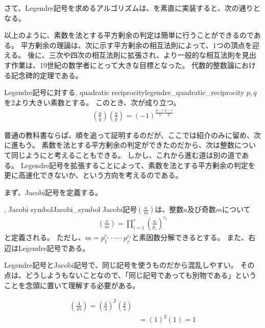さて、Legendre記号を求めるアルゴリズムは、を素直に実装すると、次の通りとなる。


以上のように、素数を法とする平方剰余の判定は簡単に行うことができるのである。
平方剰余の理論は、次に示す平方剰余の相互法則によって、1つの頂点を迎える。
後に、三次や四次の相互法則に拡張され、より一般的な相互法則を見出す作業は、19世紀の数学者にとって大きな目標となった。
代数的整数論における記念碑的定理である。

\begin{Theo}{Legendre記号に対する, quadratic reciprocity}{legendre_quadratic_reciprocity}
$p,q$を2より大きい素数とする。
このとき、次が成り立つ。
\begin{align*}
\left(\frac{p}{q}\right)\left(\frac{q}{p}\right) = (-1)^{\frac{p-1}{2}\frac{q-1}{2}}
\end{align*}
\end{Theo}

普通の教科書ならば、順を追って証明するのだが、ここでは紹介のみに留め、次に進もう。
素数を法とする平方剰余の判定ができたのだから、次は整数について同じようにと考えることもできる。
しかし、これから進む道は別の道である。
Legendre記号を拡張することによって、素数を法とする平方剰余の判定を更に高速化できないか、という方向を考えるのである。

まず、Jacobi記号を定義する。

\begin{Defi}{, Jacobi symbol}{Jacobi_symbol}
Jacobi記号$\left(\frac{a}{m}\right)$は、整数$a$及び奇数$m$について
\begin{align*}
\left(\frac{a}{m}\right) = \prod_{i = 1}^r \left(\frac{a}{p_i}\right)^{e_i}
\end{align*}
と定義される。
ただし、$m=p_1^{e_1}\cdot\cdots\cdot p_r^{e_r}$と素因数分解できるとする。
また、右辺はLegendre記号である。
\end{Defi}

Legendre記号とJacobi記号で、同じ記号を使うものだから混乱しやすい。
その点は、どうしようもないことなので、「同じ記号であっても別物である」ということを念頭に置いて理解する必要がある。

\begin{Exam}{}{}
\begin{align*}
\left(\frac{4}{45}\right) = \left(\frac{4}{3}\right)^2\left(\frac{4}{5}\right)\\
&= (1)^2(1) = 1
\end{align*}
\end{Exam}

